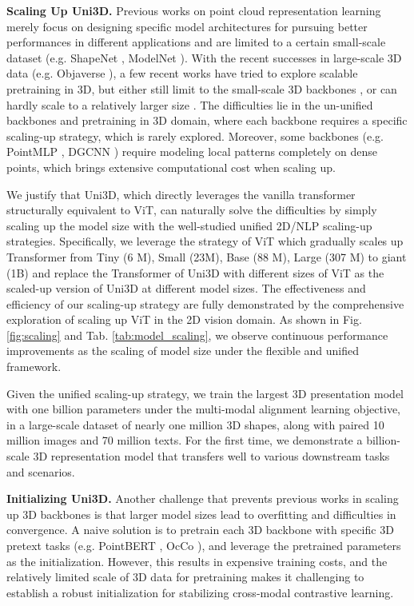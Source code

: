 \documentclass{article} \usepackage{iclr2024_conference,times}
\def\Ours{Uni3D\xspace}
\begin{document}
\noindent\textbf{Scaling Up \Ours.} 
Previous works on point cloud representation learning merely focus on designing specific model architectures for pursuing better performances in different applications and are limited to a certain small-scale dataset (e.g. ShapeNet \citep{chang2015shapenet}, ModelNet \citep{wu20153d}). 
With the recent successes in large-scale 3D data (e.g. Objaverse \citep{deitke2023objaverse,deitke2023objaversexl}), a few recent works \citep{xue2023ulip, liu2023openshape, xue2023ulip2} have tried to explore scalable pretraining in 3D, but either still limit to the small-scale 3D backbones \citep{xue2023ulip}, or can hardly scale to a relatively larger size \citep{liu2023openshape}. 
The difficulties lie in the un-unified backbones and pretraining in 3D domain, where each backbone requires a specific scaling-up strategy, which is rarely explored. 
Moreover, some backbones (e.g. PointMLP \citep{ma2021rethinking}, DGCNN \citep{wang2019dynamic}) require modeling local patterns completely on dense points, which brings extensive computational cost when scaling up.

We justify that \Ours, which directly leverages the vanilla transformer structurally equivalent to ViT, can naturally solve the difficulties by simply scaling up the model size with the well-studied unified 2D/NLP scaling-up strategies. Specifically, we leverage the strategy of ViT which gradually scales up Transformer from Tiny (6 M), Small (23M), Base (88 M), Large (307 M) to giant (1B) and replace the Transformer of \Ours with different sizes of ViT as the scaled-up version of \Ours at different model sizes. The effectiveness and efficiency of our scaling-up strategy are fully demonstrated by the comprehensive exploration of scaling up ViT in the 2D vision domain. 
As shown in Fig. \ref{fig:scaling} and Tab. \ref{tab:model_scaling}, we observe continuous performance improvements as the scaling of model size under the flexible and unified framework.

Given the unified scaling-up strategy, we train the largest 3D presentation model with one billion parameters under the multi-modal alignment learning objective, in a large-scale dataset of nearly one million 3D shapes, along with paired 10 million images and 70 million texts. For the first time, we demonstrate a billion-scale 3D representation model that transfers well to various downstream tasks and scenarios.

\noindent\textbf{Initializing \Ours.} Another challenge that prevents previous works in scaling up 3D backbones is that larger model sizes lead to overfitting and difficulties in convergence. A naive solution is to pretrain each 3D backbone with specific 3D pretext tasks (e.g. PointBERT \citep{yu2022point}, OcCo \citep{wang2021unsupervised}), and leverage the pretrained parameters as the initialization. 
However, this results in expensive training costs, and the relatively limited scale of 3D data for pretraining makes it challenging to establish a robust initialization for stabilizing cross-modal contrastive learning.
\end{document}

